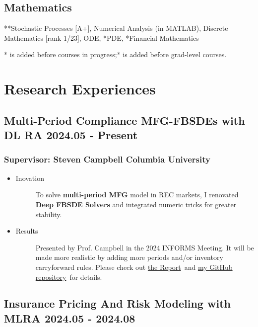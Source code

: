 \documentclass[a4paper]{article}
\newcommand{\mygray}{\color{lg}}
\newcommand{\MFG}{\href{https://github.com/OrangeAoo/Multi-Period-Compliance-MFG-FBSDEs}{my GitHub repository}}
\newcommand{\Report}{\href{https://github.com/OrangeAoo/Multi-Compliance-MFG-FBSDEs/blob/ca6adb57636c1fc1ff9daea8d57f004e5762fd4d/FinalReports/Report-v3.pdf}{the Report}}
\begin{document}
\subsection{Mathematics} 
**Stochastic Processes {\small[A+]}, Numerical Analysis {\small(in MATLAB)}, Discrete Mathematics {\small[rank 1/23]}, ODE, *PDE, *Financial Mathematics

{\parskip=2pt \mygray
* is added before courses in progress;\hfill ** is added before grad-level courses.}
\section{Research Experiences}  %

\hypertarget{FBSDEs}{
    \subsection{Multi-Period Compliance MFG-FBSDEs with DL \normalfont \hfill RA \hspace{40pt} 2024.05 - Present}}
    
\subsubsection{Supervisor:  Steven Campbell \hfill Columbia University}
\begin{itemize}
    \item\begin{description}
        \item[Inovation] To solve \textbf{multi-period MFG} model in REC markets, I renovated \textbf{Deep FBSDE Solvers} and integrated numeric tricks for greater stability.
        \end{description} 
    \item\begin{description}
        \item[Results] Presented by Prof. Campbell in the 2024 INFORMS Meeting. It will be made more realistic by adding more periods and/or inventory carryforward rules. Please check out \Report\ and \MFG\ for details.
    \end{description}
\end{itemize} 

\hypertarget{integrated-project}{
    \subsection{Insurance Pricing And Risk Modeling with ML\normalfont \hfill RA \hspace{40pt} 2024.05 - 2024.08}}
\end{document}
